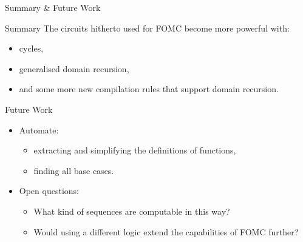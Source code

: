 \documentclass{beamer}
\begin{document}
\begin{frame}{Summary \& Future Work}
  \begin{block}{Summary}
    The circuits hitherto used for FOMC become more powerful with:
    \begin{itemize}
    \item cycles,
    \item generalised domain recursion,
    \item and some more new compilation rules that support domain recursion.
    \end{itemize}
  \end{block}
  \begin{block}{Future Work}
    \begin{itemize}
    \item Automate:
      \begin{itemize}
      \item extracting and simplifying the definitions of functions,
      \item finding all base cases.
      \end{itemize}
    \item Open questions:
      \begin{itemize}
      \item What kind of \alert{sequences} are computable in this way?
      \item Would using a \alert{different logic} extend the capabilities of FOMC further?
      \end{itemize}
    \end{itemize}
  \end{block}
\end{frame}
\end{document}
